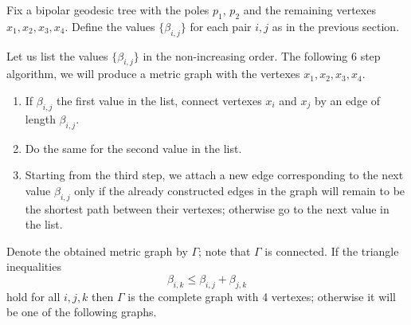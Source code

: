 Fix a bipolar geodesic tree with the poles $p_1$, $p_2$ and the remaining vertexes $x_1,x_2, x_3,x_4$.
Define the values $\{\beta_{i,j}\}$ for each pair $i,j$ as in the previous section.

Let us list the values $\{\beta_{i,j}\}$ in the non-increasing order.
The following 6 step algorithm, we will produce a metric graph with the vertexes $x_1,x_2, x_3,x_4$.
\begin{enumerate}[1.]
\item If $\beta_{i,j}$ the first value in the list, connect vertexes $x_i$ and $x_j$ by an edge of length $\beta_{i,j}$.
\item Do the same for the second value  in the list.
\item Starting from the third step, we attach a new edge corresponding to the next value $\beta_{i,j}$ only if the already constructed edges in the graph will remain to be the shortest path between their vertexes; otherwise go to the next value in the list. 
\end{enumerate}
Denote the obtained metric graph by $\Gamma$;
note that $\Gamma$ is connected. 
If the triangle inequalities 
\[\beta_{i,k}\le \beta_{i,j}+\beta_{j,k}\]
hold for all $i,j,k$ then $\Gamma$ is the complete graph with 4 vertexes;
otherwise it will be one of the following graphs.

